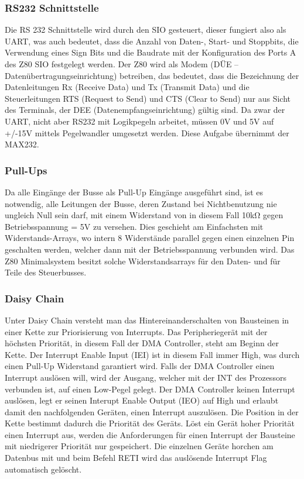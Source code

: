 \subsubsection{RS232 Schnittstelle}
Die RS 232 Schnittstelle wird durch den SIO gesteuert, dieser fungiert also als UART, was auch bedeutet, dass die Anzahl von Daten-, Start- und Stoppbits, die Verwendung eines Sign Bits und die Baudrate mit der Konfiguration des Ports A des Z80 SIO festgelegt werden. Der Z80 wird als Modem (DÜE – Datenübertragungseinrichtung) betreiben, das bedeutet, dass die Bezeichnung der Datenleitungen Rx (Receive Data) und Tx (Transmit Data) und die Steuerleitungen RTS (Request to Send) und CTS (Clear to Send) nur aus Sicht des Terminals, der DEE (Datenempfangseinrichtung) gültig sind. Da zwar der UART, nicht aber RS232 mit Logikpegeln arbeitet, müssen 0V und 5V auf +/-15V mittels Pegelwandler umgesetzt werden. Diese Aufgabe übernimmt der MAX232.

\subsubsection{Pull-Ups}
Da alle Eingänge der Busse als Pull-Up Eingänge ausgeführt sind, ist es notwendig, alle Leitungen der Busse, deren Zustand bei Nichtbenutzung nie ungleich Null sein darf, mit einem Widerstand von in diesem Fall 10kΩ gegen Betriebsspannung = 5V zu versehen. Dies geschieht am Einfachsten mit Widerstands-Arrays, wo intern 8 Widerstände parallel gegen einen einzelnen Pin geschalten werden, welcher dann mit der Betriebsspannung verbunden wird. Das Z80 Minimalsystem besitzt solche Widerstandsarrays für den Daten- und für Teile des Steuerbusses.

\subsubsection{Daisy Chain}
Unter Daisy Chain versteht man das Hintereinanderschalten von Bausteinen in einer Kette zur Priorisierung von Interrupts. Das Peripheriegerät mit der höchsten Priorität, in diesem Fall der DMA Controller, steht am Beginn der Kette. Der Interrupt Enable Input (IEI) ist in diesem Fall immer High, was durch einen Pull-Up Widerstand garantiert wird. Falls der DMA Controller einen Interrupt auslösen will, wird der Ausgang, welcher mit der INT des Prozessors verbunden ist, auf einen Low-Pegel gelegt. Der DMA Controller keinen Interrupt auslösen, legt er seinen Interupt Enable Output (IEO) auf High und erlaubt damit den nachfolgenden Geräten, einen Interrupt auszulösen. Die Position in der Kette bestimmt dadurch die Priorität des Geräts. Löst ein Gerät hoher Priorität einen Interrupt aus, werden die Anforderungen für einen Interrupt der Bausteine mit niedrigerer Priorität nur gespeichert. Die einzelnen Geräte horchen am Datenbus mit und beim Befehl RETI wird das auslösende Interrupt Flag automatisch gelöscht.

